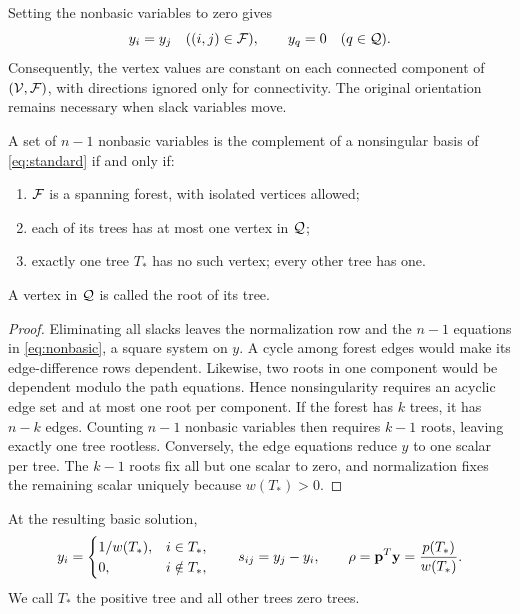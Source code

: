 Setting the nonbasic variables to zero gives
\begin{equation}\label{eq:nonbasic}
 y_i=y_j\quad((i,j)\in\mathcal F),\qquad y_q=0\quad(q\in\mathcal Q).
\end{equation}
Consequently, the vertex values are constant on each connected component of
$(\mathcal V,\mathcal F)$, with directions ignored only for connectivity.
The original orientation remains necessary when slack variables move.

\begin{theorem}\label{thm:basis}
A set of $n-1$ nonbasic variables is the complement of a nonsingular basis
of \eqref{eq:standard} if and only if:
\begin{enumerate}[label=(\roman*)]
\item $\mathcal F$ is a spanning forest, with isolated vertices allowed;
\item each of its trees has at most one vertex in $\mathcal Q$;
\item exactly one tree $T_*$ has no such vertex; every other tree has one.
\end{enumerate}
A vertex in $\mathcal Q$ is called the root of its tree.
\end{theorem}
\begin{proof}
Eliminating all slacks leaves the normalization row and the $n-1$ equations
in \eqref{eq:nonbasic}, a square system on $y$. A cycle among forest edges
would make its edge-difference rows dependent. Likewise, two roots in one
component would be dependent modulo the path equations. Hence nonsingularity
requires an acyclic edge set and at most one root per component.
If the forest has $k$ trees, it has $n-k$ edges. Counting $n-1$ nonbasic
variables then requires $k-1$ roots, leaving exactly one tree rootless.
Conversely, the edge equations reduce $y$ to one scalar per tree. The
$k-1$ roots fix all but one scalar to zero, and normalization fixes the
remaining scalar uniquely because $w(T_*)>0$.
\end{proof}

At the resulting basic solution,
\begin{equation}\label{eq:basic-solution}
 y_i=\begin{cases}1/w(T_*),&i\in T_*,\\0,&i\notin T_*,\end{cases}
 \qquad s_{ij}=y_j-y_i,\qquad
 \rho=\mathbf{p}^T\mathbf{y}=\frac{p(T_*)}{w(T_*)}.
\end{equation}
We call $T_*$ the positive tree and all other trees zero trees.

